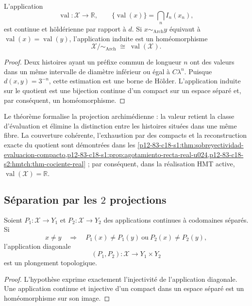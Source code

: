 \begin{theorem}
\label{p12-83-c17-s1:thm:evaluacion-holder}
\label{thm:evaluacion-holder}
L'application
\[
 \operatorname{val}:\mathcal X\longrightarrow\mathbb R,
 \qquad
 \{\operatorname{val}(x)\}=\bigcap_n I_n(x_n),
\]
est continue et höldérienne par rapport à \(d\). Si
\(x\sim_{\mathrm{Arch}}y\) équivaut à
\(\operatorname{val}(x)=\operatorname{val}(y)\), l'application induite
est un homéomorphisme
\[
 \mathcal X/{\sim_{\mathrm{Arch}}}
 \;\cong\;\operatorname{val}(\mathcal X).
\]
\end{theorem}

\begin{proof}
Deux histoires ayant un préfixe commun de longueur \(n\) ont des valeurs dans un
même intervalle de diamètre inférieur ou égal à \(C\lambda^n\). Puisque
\(d(x,y)=3^{-n}\), cette estimation est une borne de Hölder. L'application
induite sur le quotient est une bijection continue d'un compact sur
un espace séparé et, par conséquent, un homéomorphisme.
\end{proof}

Le théorème formalise la projection archimédienne : la valeur retient la classe
d'évaluation et élimine la distinction entre les histoires situées dans une même
fibre. La couverture cohérente, l'exhaustion par des compacts et la
reconstruction exacte du quotient sont démontrées dans les
\cref{p12-83-c18-s1:thm:sobreyectividad-evaluacion-compacto,p12-83-c18-s1:prop:agotamiento-recta-real-u024,p12-83-c18-s2:hmtch:thm-cociente-real} ;
par conséquent, dans la réalisation HMT active,
\(\operatorname{val}(\mathcal X)=\mathbb R\).

\subsection{Séparation par les \(2\) projections}

\begin{theorem}
\label{p12-83-c17-s1:thm:separacion-conjunta}
\label{thm:separacion-conjunta}
Soient \(P_1:\mathcal X\to Y_1\) et \(P_2:\mathcal X\to Y_2\) des applications
continues à codomaines séparés. Si
\[
 x\ne y\quad\Longrightarrow\quad
 P_1(x)\ne P_1(y)\ \text{ou}\ P_2(x)\ne P_2(y),
\]
l'application diagonale
\[
 (P_1,P_2):\mathcal X\longrightarrow Y_1\times Y_2
\]
est un plongement topologique.
\end{theorem}

\begin{proof}
L'hypothèse exprime exactement l'injectivité de l'application diagonale.
Une application continue et injective d'un compact dans un espace séparé
est un homéomorphisme sur son image.
\end{proof}

